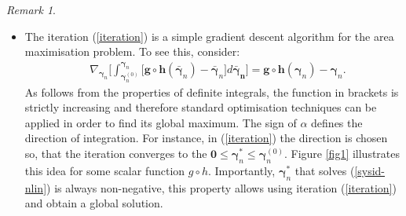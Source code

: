 \documentclass[journal,10pt,onecolumn,draftclsnofoot,]{IEEEtran}
\theoremstyle{plain}
\theoremstyle{definition}
\theoremstyle{remark}
\newtheorem*{remark}{Remark}
\begin{document}
\begin{remark} \hfill
\begin{itemize}
  \item The iteration (\ref{iteration}) is a simple gradient descent algorithm for the area maximisation problem. To see this, consider:
  \begin{equation*}
    \begin{split}
    {}& \nabla_{\bm{\gamma}_{n}} \Big[ \int_{\bm{\gamma}_{n}^{(0)}}^{\bm{\gamma}_{n}} \big[\bm{g} \circ \bm{h}(\bm{\bar{\gamma}}_{n}) - \bm{\bar{\gamma}}_{n}\big] d \bm{\bar{\gamma}_{n}} \Big] = \bm{g} \circ \bm{h}(\bm{\gamma}_{n}) - \bm{\gamma}_{n}.
    \end{split}
  \end{equation*}
  As follows from the properties of definite integrals, the function in brackets is strictly increasing and therefore standard optimisation techniques can be applied in order to find its global maximum. The sign of $\alpha$ defines the direction of integration. For instance, in (\ref{iteration}) the direction is chosen so, that the iteration converges to the $\bm{0} \le \bm{\gamma}_{n}^{*} \le \bm{\gamma}_{n}^{(0)}$. Figure \ref{fig1} illustrates this idea for some scalar function $g \circ h$. Importantly, $\bm{\gamma}_{n}^{*}$ that solves (\ref{sysid-nlin}) is always non-negative, this property allows using iteration (\ref{iteration}) and obtain a global solution. 
  \begin{figure}[t]
  \centering
\end{figure}
\end{itemize}
\end{remark}
\end{document}
